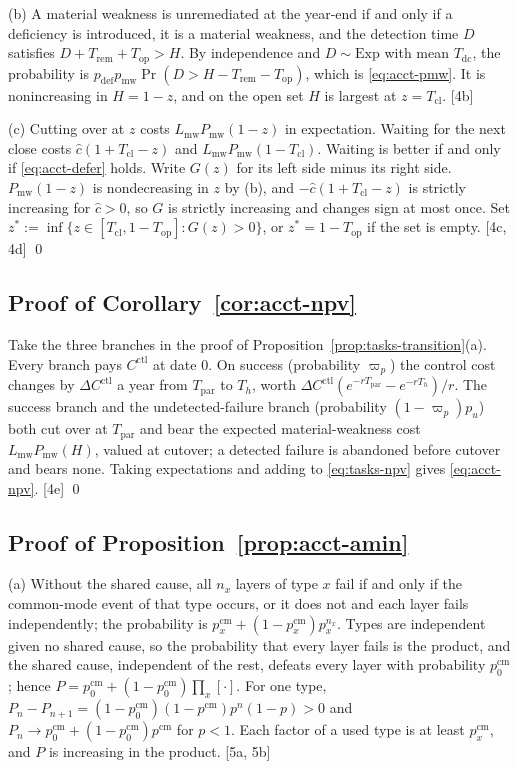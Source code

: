 (b) A material weakness is unremediated at the year-end if and only if a deficiency is introduced, it is a material weakness, and the detection time $D$ satisfies $D+T_{\mathrm{rem}}+T_{\mathrm{op}}>H$. By independence and $D\sim\mathrm{Exp}$ with mean $T_{\mathrm{dc}}$, the probability is $p_{\mathrm{def}}p_{\mathrm{mw}}\Pr(D>H-T_{\mathrm{rem}}-T_{\mathrm{op}})$, which is \eqref{eq:acct-pmw}. It is nonincreasing in $H=1-z$, and on the open set $H$ is largest at $z=T_{\mathrm{cl}}$. [4b]

(c) Cutting over at $z$ costs $L_{\mathrm{mw}}P_{\mathrm{mw}}(1-z)$ in expectation. Waiting for the next close costs $\hat c(1+T_{\mathrm{cl}}-z)$ and $L_{\mathrm{mw}}P_{\mathrm{mw}}(1-T_{\mathrm{cl}})$. Waiting is better if and only if \eqref{eq:acct-defer} holds. Write $G(z)$ for its left side minus its right side. $P_{\mathrm{mw}}(1-z)$ is nondecreasing in $z$ by (b), and $-\hat c(1+T_{\mathrm{cl}}-z)$ is strictly increasing for $\hat c>0$, so $G$ is strictly increasing and changes sign at most once. Set $z^*:=\inf\{z\in[T_{\mathrm{cl}},1-T_{\mathrm{op}}]:G(z)>0\}$, or $z^*=1-T_{\mathrm{op}}$ if the set is empty. [4c, 4d] \qed

\subsection*{Proof of Corollary~\ref{cor:acct-npv}}

Take the three branches in the proof of Proposition~\ref{prop:tasks-transition}(a). Every branch pays $C^{\mathrm{ctl}}$ at date 0. On success (probability $\varpi_p$) the control cost changes by $\Delta C^{\mathrm{ctl}}$ a year from $T_{\mathrm{par}}$ to $T_h$, worth $\Delta C^{\mathrm{ctl}}(e^{-rT_{\mathrm{par}}}-e^{-rT_h})/r$. The success branch and the undetected-failure branch (probability $(1-\varpi_p)p_u$) both cut over at $T_{\mathrm{par}}$ and bear the expected material-weakness cost $L_{\mathrm{mw}}P_{\mathrm{mw}}(H)$, valued at cutover; a detected failure is abandoned before cutover and bears none. Taking expectations and adding to \eqref{eq:tasks-npv} gives \eqref{eq:acct-npv}. [4e] \qed

\subsection*{Proof of Proposition~\ref{prop:acct-amin}}

(a) Without the shared cause, all $n_x$ layers of type $x$ fail if and only if the common-mode event of that type occurs, or it does not and each layer fails independently; the probability is $p^{\mathrm{cm}}_x+(1-p^{\mathrm{cm}}_x)p_x^{n_x}$. Types are independent given no shared cause, so the probability that every layer fails is the product, and the shared cause, independent of the rest, defeats every layer with probability $p^{\mathrm{cm}}_0$; hence $P=p^{\mathrm{cm}}_0+(1-p^{\mathrm{cm}}_0)\prod_x[\cdot]$. For one type, $P_n-P_{n+1}=(1-p^{\mathrm{cm}}_0)(1-p^{\mathrm{cm}})p^n(1-p)>0$ and $P_n\to p^{\mathrm{cm}}_0+(1-p^{\mathrm{cm}}_0)p^{\mathrm{cm}}$ for $p<1$. Each factor of a used type is at least $p^{\mathrm{cm}}_x$, and $P$ is increasing in the product. [5a, 5b]

